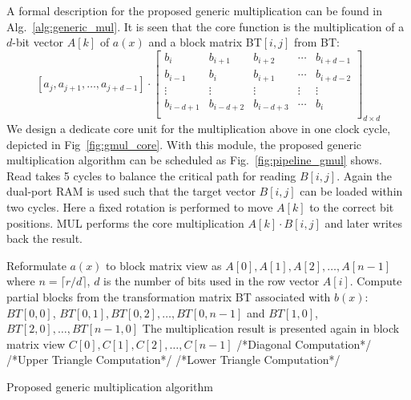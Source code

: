 \documentclass[preprint]{iacrtrans}
\begin{document}
A formal description for the proposed generic multiplication can be found in Alg.~\ref{alg:generic_mul}. It is seen that the core function is the multiplication of a $d$-bit vector $A[k]$ of $a(x)$ and a block matrix BT$[i,j]$ from BT:
\[
    [a_j,a_{j+1},\ldots,a_{j+d-1}]\cdot
\left[ \begin{array}{ccccc}
b_{i}&b_{i+1}&b_{i+2}&\cdots &b_{i+d-1} \\
b_{i-1}&b_{i}&b_{i+1}&\cdots &b_{i+d-2} \\
\vdots&\vdots&\vdots&\vdots&\vdots\\
b_{i-d+1}&b_{i-d+2}&b_{i-d+3}&\cdots &b_{i} \\
\end{array}
\right ]_{d\times d}
\]
We design a dedicate core unit for the multiplication above in one clock cycle, depicted in Fig~\ref{fig:gmul_core}. With this module, the proposed generic multiplication algorithm can be scheduled as Fig.~\ref{fig:pipeline_gmul} shows. Read takes 5 cycles to balance the critical path for reading $B[i,j]$. Again the dual-port RAM is used such that the target vector $B[i,j]$ can be loaded within two cycles. Here a fixed rotation is performed to move $A[k]$ to the correct bit positions. MUL performs the core multiplication $A[k]\cdot B[i,j]$ and later writes back the result.

\begin{algorithm}[!tbh]
 \DontPrintSemicolon %
    Reformulate $a(x)$ to block matrix view as $A[0],A[1],A[2],\ldots, A[n-1]$ where $n=\lceil r/d \rceil$, $d$ is the number of bits used in the row vector $A[i]$.\;
    Compute partial blocks from the transformation matrix BT associated with $b(x)$: $BT[0,0]$, $BT[0,1],BT[0,2],\ldots,BT[0,n-1]$ and $BT[1,0]$, $BT[2,0],\ldots,BT[n-1,0]$\;
    The multiplication result is presented again in block matrix view $C[0],C[1],C[2],\ldots, C[n-1]$\;
    /*Diagonal Computation*/\;
    /*Upper Triangle Computation*/\;
    /*Lower Triangle Computation*/\;
 \caption{Proposed generic multiplication algorithm}\label{alg:generic_mul}
\end{algorithm}
\end{document}
